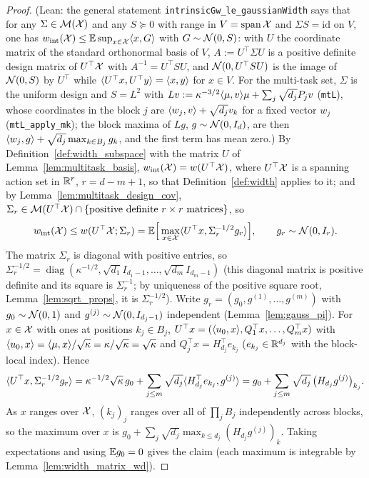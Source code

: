 \begin{proof}
\leanok
{}
(Lean: the general statement \texttt{intrinsicGw\_le\_gaussianWidth} says that for any
$\Sigma \in \mathcal{M}(\mathcal{X})$ and any $S \succeq 0$ with range in $V = \operatorname{span}\mathcal{X}$ and
$\Sigma S = \mathrm{id}$ on $V$, one has $w_{\mathrm{int}}(\mathcal{X}) \le \mathbb{E}\sup_{x\in\mathcal{X}}\langle x, G \rangle$
with $G \sim \mathcal{N}(0,S)$: with $U$ the coordinate matrix of the standard orthonormal basis
of $V$, $A := U^\top\Sigma U$ is a positive definite design matrix of $U^\top\mathcal{X}$ with
$A^{-1} = U^\top SU$, and $\mathcal{N}(0,U^\top SU)$ is the image of $\mathcal{N}(0,S)$ by $U^\top$
while $\langle U^\top x, U^\top y \rangle = \langle x, y \rangle$ for $x \in V$. For the multi-task set, $\Sigma$ is
the uniform design and $S = L^2$ with $L v := \kappa^{-3/2}\langle \mu, v \rangle\mu + \sum_j\sqrt{d_j}P_jv$
(\texttt{mtL}), whose coordinates in the block $j$ are $\langle w_j, v \rangle + \sqrt{d_j}v_k$ for a fixed
vector $w_j$ (\texttt{mtL\_apply\_mk}); the block maxima of $Lg$, $g\sim\mathcal{N}(0,I_d)$, are
then $\langle w_j, g \rangle + \sqrt{d_j}\max_{k\in B_j}g_k$, and the first term has mean zero.)
By Definition~\ref{def:width_subspace} with the matrix $U$ of Lemma~\ref{lem:multitask_basis},
$w_{\mathrm{int}}(\mathcal{X}) = w(U^\top\mathcal{X})$, where $U^\top\mathcal{X}$ is a spanning action set in
$\mathbb{R}^r$, $r = d - m + 1$, so that Definition~\ref{def:width} applies to it; and by
Lemma~\ref{lem:multitask_design_cov},
$\Sigma_r \in \mathcal{M}(U^\top\mathcal{X})\cap\{\text{positive definite } r\times r \text{ matrices}\}$, so
\[
  w_{\mathrm{int}}(\mathcal{X}) \le w(U^\top\mathcal{X};\Sigma_r) = \mathbb{E}\Big[\max_{x\in\mathcal{X}}\langle U^\top x, \Sigma_r^{-1/2}g_r \rangle\Big],
  \qquad g_r \sim \mathcal{N}(0, I_r).
\]
The matrix $\Sigma_r$ is diagonal with positive entries, so
$\Sigma_r^{-1/2} = \operatorname{diag}(\kappa^{-1/2}, \sqrt{d_1}I_{d_1-1},\dots,\sqrt{d_m}I_{d_m-1})$
(this diagonal matrix is positive definite and its square is $\Sigma_r^{-1}$; by uniqueness
of the positive square root, Lemma~\ref{lem:sqrt_props}, it is $\Sigma_r^{-1/2}$). Write
$g_r = (g_0, g^{(1)},\dots,g^{(m)})$ with $g_0 \sim \mathcal{N}(0,1)$ and
$g^{(j)}\sim\mathcal{N}(0,I_{d_j-1})$ independent (Lemma~\ref{lem:gauss_pi}). For $x \in \mathcal{X}$
with ones at positions $k_j \in B_j$, $U^\top x = (\langle u_0, x \rangle, Q_1^\top x,\dots,Q_m^\top x)$
with $\langle u_0, x \rangle = \langle \mu, x \rangle/\sqrt\kappa = \kappa/\sqrt\kappa = \sqrt\kappa$ and
$Q_j^\top x = H_{d_j}^\top e_{k_j}$ ($e_{k_j} \in \mathbb{R}^{d_j}$ with the block-local index).
Hence
\[
  \langle U^\top x, \Sigma_r^{-1/2}g_r \rangle = \kappa^{-1/2}\sqrt\kappa\, g_0
  + \sum_{j\le m}\sqrt{d_j}\langle H_{d_j}^\top e_{k_j}, g^{(j)} \rangle
  = g_0 + \sum_{j\le m}\sqrt{d_j}\,\big(H_{d_j}g^{(j)}\big)_{k_j}.
\]
As $x$ ranges over $\mathcal{X}$, $(k_j)_j$ ranges over all of $\prod_j B_j$ independently across
blocks, so the maximum over $x$ is
$g_0 + \sum_j\sqrt{d_j}\max_{k\le d_j}(H_{d_j}g^{(j)})_k$. Taking expectations and using
$\mathbb{E} g_0 = 0$ gives the claim (each maximum is integrable by Lemma~\ref{lem:width_matrix_wd}).
\end{proof}

